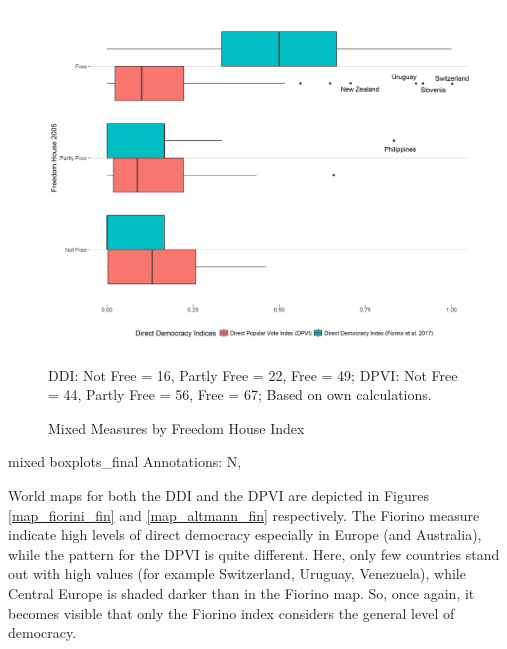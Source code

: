 \documentclass[]{article}
\begin{document}
\begin{figure}[!th]
    \caption{Mixed Measures by Freedom House Index}
    \label{boxplots_final}
    \includegraphics[width=\textwidth]{images/boxplots_final.png}
    \flushright
    {\scriptsize DDI: Not Free = 16, Partly Free = 22, Free = 49; DPVI: Not Free = 44, Partly Free = 56, Free = 67; Based on own calculations. \par}
\end{figure}

mixed boxplots\_final Annotations: N,

World maps for both the DDI and the DPVI are depicted in Figures
\ref{map_fiorini_fin} and \ref{map_altmann_fin} respectively. The
Fiorino measure indicate high levels of direct democracy especially in
Europe (and Australia), while the pattern for the DPVI is quite
different. Here, only few countries stand out with high values (for
example Switzerland, Uruguay, Venezuela), while Central Europe is shaded
darker than in the Fiorino map. So, once again, it becomes visible that
only the Fiorino index considers the general level of democracy.
\end{document}
